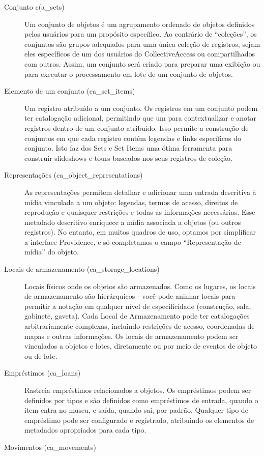 \begin{description}
	\item[Conjunto c(a\_sets)] Um conjunto de objetos é um agrupamento ordenado de objetos definidos pelos usuários para um propósito específico.	Ao contrário de ``coleções'', os conjuntos são grupos adequados para uma única coleção de registros, sejam eles específicos de um dos usuários do CollectiveAccess ou compartilhados com outros.	Assim, um conjunto será criado para preparar uma exibição ou para executar o processamento em lote de um conjunto de objetos.
	\item[Elemento de um conjunto (ca\_set\_items)] Um registro atribuído a um conjunto. Os registros em um conjunto podem ter catalogação adicional, permitindo que um para contextualizar e anotar registros dentro de um conjunto atribuído. Isso permite a construção de conjuntos em que cada registro contém legendas e links específicos do conjunto. Isto faz dos Sets e Set Items uma ótima ferramenta para construir slideshows e tours baseados nos seus registros de coleção.
	\item[Representações (ca\_object\_representations)] As representações permitem detalhar e adicionar uma entrada descritiva à mídia vinculada a um objeto: legendas, termos de acesso, direitos de reprodução e quaisquer restrições e todas as informações necessárias. Esse metadado descritivo enriquece a mídia associada a objetos (ou outros registros).	No entanto, em muitos quadros de uso, optamos por simplificar a interface Providence, e só completamos o campo ``Representação de mídia'' do objeto.
	\item[Locais de armazenamento (ca\_storage\_locations)] Locais físicos onde os objetos são armazenados. Como os lugares, os locais de armazenamento são hierárquicos - você pode aninhar locais para permitir a notação em qualquer nível de especificidade (construção, sala, gabinete, gaveta). Cada Local de Armazenamento pode ter catalogações arbitrariamente complexas, incluindo restrições de acesso, coordenadas de mapas e outras informações. Os locais de armazenamento podem ser vinculados a objetos e lotes, diretamente ou por meio de eventos de objeto ou de lote.
	\item[Empréstimos (ca\_loans)] Rastreia empréstimos relacionados a objetos. Os empréstimos podem ser definidos por tipos e são definidos como empréstimos de entrada, quando o item entra no museu, e saída, quando sai, por padrão. Qualquer tipo de empréstimo pode ser configurado e registrado, atribuindo os elementos de metadados apropriados para cada tipo.
	\item[Movimentos (ca\_movements)] 

\end{description}
